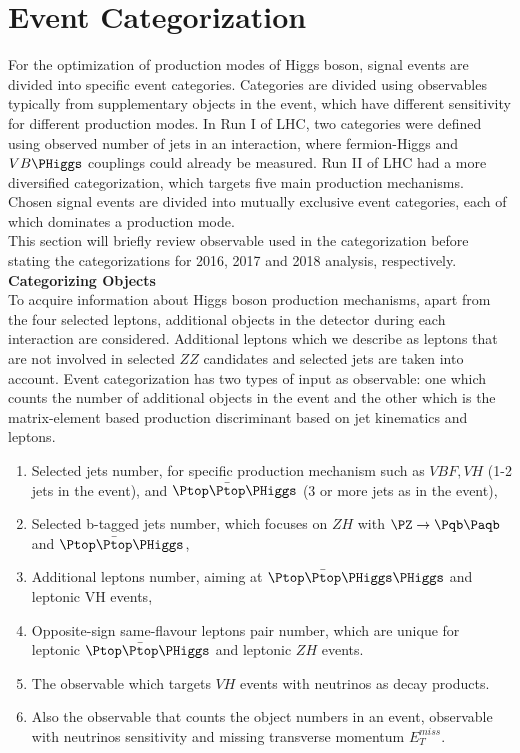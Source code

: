 \section{Event Categorization}
\label{section:ec}
For the optimization of production modes of Higgs boson, signal events are divided into specific event categories. Categories are divided using observables typically from supplementary objects in the event, which have different sensitivity for different production modes. In Run I of LHC, two categories were defined using observed number of jets in an interaction, where fermion-Higgs and $V B \PHiggs$ couplings could already be measured. Run II of LHC had a more diversified categorization, which targets five main production mechanisms. Chosen signal events are divided into mutually exclusive event categories, each of which dominates a production mode.\\
This section will briefly review observable used in the categorization before stating the categorizations for 2016, 2017 and 2018 analysis, respectively.\\

\textbf{Categorizing Objects}\\
To acquire information about Higgs boson production mechanisms, apart from the four selected leptons, additional objects in the detector during each interaction are considered. Additional leptons which we describe as leptons that are not involved in selected $ZZ$ candidates and selected jets are taken into account. Event categorization has two types of input as observable: one which counts the number of additional objects in the event and the other which is the matrix-element based production discriminant based on jet kinematics and leptons.
\begin{enumerate}
    \item Selected jets number, for specific production mechanism such as $VBF, VH$ (1-2 jets in the event), and $\Ptop \Bar{\Ptop}\PHiggs$ (3 or more jets as in the event),
    \item Selected b-tagged jets number, which focuses on $ZH$ with $\PZ \rightarrow \Pqb \Paqb$ and $\Ptop \Bar{\Ptop}\PHiggs$,
    \item Additional leptons number, aiming at $\Ptop \Bar{\Ptop}\PHiggs\PHiggs$ and leptonic VH events,
    \item Opposite-sign same-flavour leptons pair number, which are unique for leptonic $\Ptop \Bar{\Ptop}\PHiggs$ and leptonic $ZH$ events.
    \item The observable which targets $VH$ events with neutrinos as decay products.
    \item Also the observable that counts the object numbers in an event, observable with neutrinos sensitivity and missing transverse momentum $E^{miss}_T$. 
\end{enumerate}

